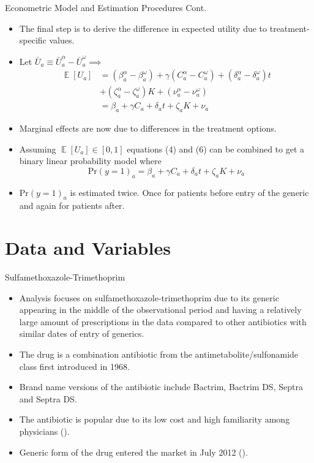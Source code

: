 \documentclass{beamer}
\DeclareMathOperator{\EX}{\mathbb{E}}
\begin{document}
\begin{frame}{Econometric Model and Estimation Procedures Cont.}
\begin{itemize}
\item The final step is to derive the difference in expected utility due to treatment-specific values.
\item Let $\bar{U}_a \equiv \bar{U}_a^\alpha - \bar{U}_a^\omega \implies$
\begin{equation}
\begin{split}
  \EX[U_a] & = (\beta_a^\alpha - \beta_a^\omega) + \gamma (C_a^\alpha - C_a^\omega) + (\delta_a^\alpha - \delta_a^\omega)t\\
  & + (\zeta^\alpha_a - \zeta^\omega_a)K + (\nu_a^\alpha - \nu_a^\omega)\\
  & = \beta_a + \gamma C_a + \delta_at + \zeta_aK + \nu_a
\end{split}
\end{equation}
\item Marginal effects are now due to differences in the treatment options.
\item Assuming $\EX[U_a] \in [0,1]$ equations (4) and (6) can be combined to get a binary linear probability model where
\begin{equation}
  \text{Pr}(y = 1)_a = \beta_a + \gamma C_a + \delta_at + \zeta_aK + \nu_a
\end{equation}
\item $\text{Pr}(y = 1)_a$ is estimated twice. Once for patients before entry of the generic and again for patients after.
\end{itemize}  
\end{frame}

\section{Data and Variables}
\begin{frame}{Sulfamethoxazole-Trimethoprim}
\begin{itemize}
\item Analysis focuses on sulfamethoxazole-trimethoprim due to its generic appearing in the middle of the observational period and having a relatively large amount of prescriptions in the data compared to other antibiotics with similar dates of entry of generics.
\item The drug is a combination antibiotic from the antimetabolite/sulfonamide class first introduced in 1968.
\item Brand name versions of the antibiotic include Bactrim, Bactrim DS, Septra and Septra DS.
\item The antibiotic is popular due to its low cost and high familiarity among physicians (\cite{ho_considerations_2011}).
\item Generic form of the drug entered the market in July 2012 (\cite{noauthor_sulfamethoxazole_nodate}).
\end{itemize}

\end{frame}
\end{document}
